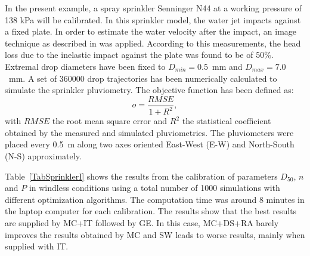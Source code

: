 \documentclass[review,authoryear]{elsarticle}
\newcommand{\EQ}[2]
{\begin{equation}#1\label{#2}\end{equation}}
\begin{document}
In the present example, a spray sprinkler Senninger N44 at a working pressure of 138 kPa will be calibrated. In this sprinkler model, the water jet impacts against a fixed plate. In order to estimate the water velocity after the impact, an image technique as described in \citet{Salvador09} was applied. According to this measurements, the head loss due to the inelastic impact against the plate was found to be of 50\%. Extremal drop diameters have been fixed to $D_{min}=0.5$~mm and
$D_{max}=7.0$~mm. A set of 360000 drop trajectories has been numerically calculated to simulate the sprinkler pluviometry. The objective function has been defined as:
\EQ{o=\frac{RMSE}{1+R^2},}{EqSprinklerObjective}
with $RMSE$ the root mean square error and $R^2$ the statistical coefficient obtained by the
measured and simulated pluviometries. The pluviometers were placed every 0.5~m along two axes
oriented East-West (E-W) and North-South (N-S) approximately.

Table~\ref{TabSprinklerI} shows the results from the calibration of parameters $D_{50}$, $n$ and $P$ in windless conditions using a total number of 1000 simulations with different optimization algorithms. The computation time was around 8 minutes in the laptop computer for each calibration. The results show that the best results are supplied by MC+IT followed by GE. In this case,
MC+DS+RA barely improves the results obtained by MC 
and SW leads to worse results, mainly when supplied with IT. 
\end{document}
